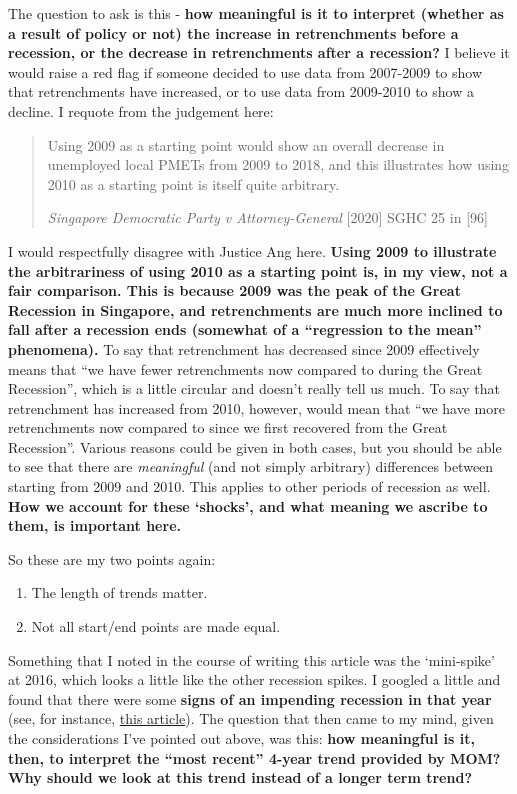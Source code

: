 \documentclass[openany]{book}
\providecommand{\tightlist}{%
  \setlength{\itemsep}{0pt}\setlength{\parskip}{0pt}}
\begin{document}
The question to ask is this - \textbf{how meaningful is it to interpret
(whether as a result of policy or not) the increase in retrenchments
before a recession, or the decrease in retrenchments after a recession?}
I believe it would raise a red flag if someone decided to use data from
2007-2009 to show that retrenchments have increased, or to use data from
2009-2010 to show a decline. I requote from the judgement here:

\begin{quote}
Using 2009 as a starting point would show an overall decrease in
unemployed local PMETs from 2009 to 2018, and this illustrates how using
2010 as a starting point is itself quite arbitrary.

\emph{Singapore Democratic Party v Attorney-General} {[}2020{]} SGHC 25
in {[}96{]}
\end{quote}

I would respectfully disagree with Justice Ang here. \textbf{Using 2009
to illustrate the arbitrariness of using 2010 as a starting point is, in
my view, not a fair comparison. This is because 2009 was the peak of the
Great Recession in Singapore, and retrenchments are much more inclined
to fall after a recession ends (somewhat of a ``regression to the mean''
phenomena).} To say that retrenchment has decreased since 2009
effectively means that ``we have fewer retrenchments now compared to
during the Great Recession'', which is a little circular and doesn't
really tell us much. To say that retrenchment has increased from 2010,
however, would mean that ``we have more retrenchments now compared to
since we first recovered from the Great Recession''. Various reasons
could be given in both cases, but you should be able to see that there
are \emph{meaningful} (and not simply arbitrary) differences between
starting from 2009 and 2010. This applies to other periods of recession
as well. \textbf{How we account for these `shocks', and what meaning we
ascribe to them, is important here.}

So these are my two points again:

\begin{enumerate}
\def\labelenumi{\arabic{enumi}.}
\tightlist
\item
  The length of trends matter.
\item
  Not all start/end points are made equal.
\end{enumerate}

Something that I noted in the course of writing this article was the
`mini-spike' at 2016, which looks a little like the other recession
spikes. I googled a little and found that there were some \textbf{signs
of an impending recession in that year} (see, for instance,
\href{https://www.cnbc.com/2016/11/23/is-singapores-economy-headed-for-a-technical-recession.html}{this
article}). The question that then came to my mind, given the
considerations I've pointed out above, was this: \textbf{how meaningful
is it, then, to interpret the ``most recent'' 4-year trend provided by
MOM? Why should we look at this trend instead of a longer term trend?}
\end{document}
